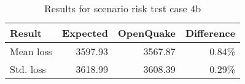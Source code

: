\begin{table}[htbp]

\centering
\begin{tabular}{ l r r r }

\hline
\rowcolor{anti-flashwhite}
\bf{Result} & \bf{Expected} & \bf{OpenQuake} & \bf{Difference}\\
\hline
Mean loss & 3597.93 & 3567.87 & 0.84\% \\
Std. loss & 3618.99 & 3608.39 & 0.29\% \\
\hline
\end{tabular}

\caption{Results for scenario risk test case 4b}
\label{tab:result-scenario-risk-4b}
\end{table}